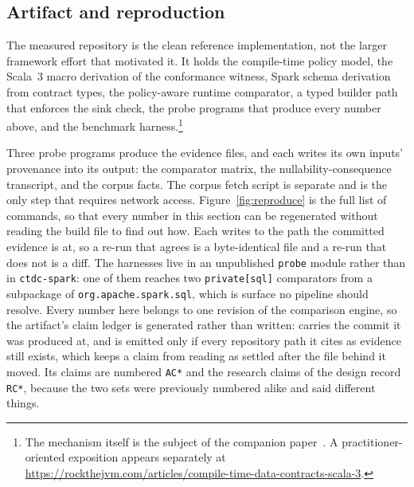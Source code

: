 \subsection{Artifact and reproduction}

The measured repository is the clean reference implementation, not the larger framework effort that motivated it. It holds the compile-time policy model, the Scala~3 macro derivation of the conformance witness, Spark schema derivation from contract types, the policy-aware runtime comparator, a typed builder path that enforces the sink check, the probe programs that produce every number above, and the benchmark harness.\footnote{The mechanism itself is the subject of the companion paper~\cite{mirji_shift_left_2026}. A practitioner-oriented exposition appears separately at \url{https://rockthejvm.com/articles/compile-time-data-contracts-scala-3}.}

Three probe programs produce the evidence files, and each writes its own inputs' provenance into its output: the comparator matrix, the nullability-consequence transcript, and the corpus facts. The corpus fetch script is separate and is the only step that requires network access. Figure~\ref{fig:reproduce} is the full list of commands, so that every number in this section can be regenerated without reading the build file to find out how. Each writes to the path the committed evidence is at, so a re-run that agrees is a byte-identical file and a re-run that does not is a diff. The harnesses live in an unpublished \texttt{probe} module rather than in \texttt{ctdc-spark}: one of them reaches two \texttt{private[sql]} comparators from a subpackage of \texttt{org.apache.spark.sql}, which is surface no pipeline should resolve. Every number here belongs to one revision of the comparison engine, so the artifact's claim ledger is generated rather than written:  carries the commit it was produced at, and is emitted only if every repository path it cites as evidence still exists, which keeps a claim from reading as settled after the file behind it moved. Its claims are numbered \texttt{AC*} and the research claims of the design record \texttt{RC*}, because the two sets were previously numbered alike and said different things.

